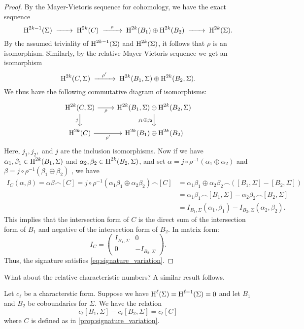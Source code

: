 \begin{proof}
	By the Mayer-Vietoris sequence for cohomology, we have the exact sequence
	\[
		\H^{2k-1}(\Sigma)\lkxto \H^{2k}(C) \lkxto[\rho] \H^{2k}(B_1)\oplus \H^{2k}(B_2) \lkxto \H^{2k}(\Sigma).
	\]
	By the assumed triviality of $\operatorname{H}^{2k-1}(\Sigma)$ and $\operatorname{H}^{2k}(\Sigma)$, it follows that $\rho$ is an isomorphism. Similarly, by the relative Mayer-Vietoris sequence we get an isomorphism
	\[
		\H^{2k}(C, \Sigma) \lkxto[\rho'] \H^{2k}(B_1, \Sigma)\oplus \H^{2k}(B_2, \Sigma).
	\]
	We thus have the following commutative diagram of isomorphisms:
	\begin{equation}\label{eq:signature_variation_square}
		\begin{tikzcd}
			{\H^{2k}(C,\Sigma)} & {\H^{2k}(B_1,\Sigma)\oplus\H^{2k}(B_2,\Sigma)} \\
			{\H^{2k}(C)} & {\H^{2k}(B_1)\oplus\H^{2k}(B_2)}
			\arrow["j_1\oplus j_2"', from=1-2, to=2-2]
			\arrow["\rho"', from=1-1, to=1-2]
			\arrow["j"', from=1-1, to=2-1]
			\arrow["\rho'"', from=2-1, to=2-2]
		\end{tikzcd}
	\end{equation}
	Here, $j_1, j_2,$ and $j$ are the inclusion isomorphisms. Now if we have $\alpha_1, \beta_1\in \operatorname{H}^{2k}(B_1, \Sigma)$ and $\alpha_2, \beta_2\in \operatorname{H}^{2k}(B_2, \Sigma)$, and set $\alpha = j\circ \rho^{-1}(\alpha_1\oplus\alpha_2)$ and
	$\beta = j\circ \rho^{-1}(\beta_1\oplus\beta_2)$
	, we have
	\[
		\begin{aligned}
			I_C(\alpha, \beta) = \alpha\beta\frown [C]
			= j\circ\rho^{-1}(\alpha_1\beta_1\oplus \alpha_2\beta_2)\frown [C]
			 & = \alpha_1\beta_1\oplus \alpha_2\beta_2\frown ([B_1, \Sigma]-[B_2, \Sigma]) \\
			 & = \alpha_1\beta_1 \frown [B_1,\Sigma] -\alpha_2\beta_2\frown [B_2,\Sigma]   \\
			 & =I_{B_1,\Sigma}(\alpha_1, \beta_1) - I_{B_2,\Sigma}(\alpha_2, \beta_2).
		\end{aligned}
	\]
	This implies that the intersection form of $C$ is the direct sum of the intersection form of $B_1$ and negative of the intersection form of $B_2$. In matrix form:
	\[
		I_C = \begin{pmatrix}I_{B_1,\Sigma} & 0 \\ 0 & -I_{B_2,\Sigma}\end{pmatrix}.
	\]
	Thus, the signature satisfies \cref{eq:signature_variation}.
\end{proof}

What about the relative characteristic numbers? A similar result follows.
\begin{proposition}
	Let $c_\ell$ be a characterstic form. Suppose we have $\operatorname{H}^{\ell}(\Sigma)=\operatorname{H}^{\ell-1}(\Sigma)=0$ and
	let $B_1$ and $B_2$ be coboundaries for $\Sigma$. We have the relation
	\begin{equation}\label{eq:characteristic_number_variation}
		c_\ell[B_1, \Sigma] - c_\ell[B_2, \Sigma] = c_\ell[C]
	\end{equation}
	where $C$ is defined as in \cref{prop:signature_variation}.
\end{proposition}


